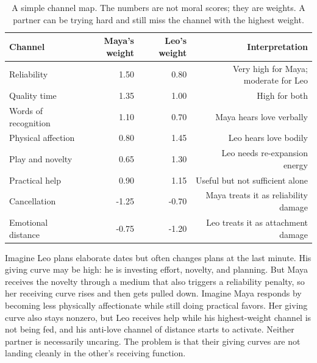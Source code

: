 \documentclass[11pt]{article}
\begin{document}
\begin{table}[ht]
\centering
\begin{tabular}{lrrr}
\toprule
Channel & Maya's weight & Leo's weight & Interpretation \\
\midrule
Reliability & 1.50 & 0.80 & Very high for Maya; moderate for Leo \\
Quality time & 1.35 & 1.00 & High for both \\
Words of recognition & 1.10 & 0.70 & Maya hears love verbally \\
Physical affection & 0.80 & 1.45 & Leo hears love bodily \\
Play and novelty & 0.65 & 1.30 & Leo needs re-expansion energy \\
Practical help & 0.90 & 1.15 & Useful but not sufficient alone \\
Cancellation & -1.25 & -0.70 & Maya treats it as reliability damage \\
Emotional distance & -0.75 & -1.20 & Leo treats it as attachment damage \\
\bottomrule
\end{tabular}
\caption{A simple channel map. The numbers are not moral scores; they are weights. A partner can be trying hard and still miss the channel with the highest weight.}
\label{tab:case-weights}
\end{table}

Imagine Leo plans elaborate dates but often changes plans at the last minute. His giving curve may be high: he is investing effort, novelty, and planning. But Maya receives the novelty through a medium that also triggers a reliability penalty, so her receiving curve rises and then gets pulled down. Imagine Maya responds by becoming less physically affectionate while still doing practical favors. Her giving curve also stays nonzero, but Leo receives help while his highest-weight channel is not being fed, and his anti-love channel of distance starts to activate. Neither partner is necessarily uncaring. The problem is that their giving curves are not landing cleanly in the other's receiving function.
\end{document}
